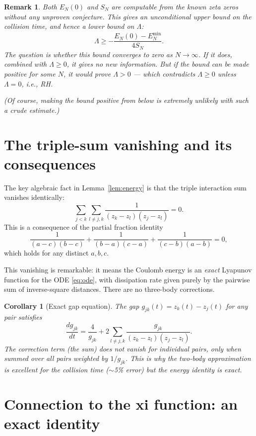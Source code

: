 \documentclass[11pt,a4paper]{article}
\newtheorem{corollary}{Corollary}
\newtheorem{remark}{Remark}
\begin{document}
\begin{remark}
  Both $E_N(0)$ and $S_N$ are computable from the known zeta
  zeros without any unproven conjecture. This gives an
  \emph{unconditional} upper bound on the collision time, and
  hence a lower bound on $\Lambda$:
  \[
    \Lambda \geq -\frac{E_N(0) - E_N^{\min}}{4S_N}.
  \]
  The question is whether this bound converges to zero as
  $N \to \infty$. If it does, combined with $\Lambda \geq 0$,
  it gives no new information. But if the bound can be made
  \emph{positive} for some $N$, it would prove $\Lambda > 0$
  --- which contradicts $\Lambda \geq 0$ unless $\Lambda = 0$,
  i.e., RH.

  (Of course, making the bound positive from below is
  extremely unlikely with such a crude estimate.)
\end{remark}

\section{The triple-sum vanishing and its consequences}

The key algebraic fact in Lemma~\ref{lem:energy} is that the
triple interaction sum vanishes identically:
\[
  \sum_{j<k}\sum_{l \neq j,k}
  \frac{1}{(z_k - z_l)(z_j - z_l)} = 0.
\]
This is a consequence of the partial fraction identity
\[
  \frac{1}{(a-c)(b-c)} + \frac{1}{(b-a)(c-a)}
  + \frac{1}{(c-b)(a-b)} = 0,
\]
which holds for any distinct $a, b, c$.

This vanishing is remarkable: it means the Coulomb energy is
an \emph{exact} Lyapunov function for the ODE \eqref{eq:ode},
with dissipation rate given purely by the pairwise sum of
inverse-square distances. There are no three-body corrections.

\begin{corollary}[Exact gap equation]
  The gap $g_{jk}(t) = z_k(t) - z_j(t)$ for any pair satisfies
  \begin{equation}\label{eq:gap-exact}
    \frac{dg_{jk}}{dt} = \frac{4}{g_{jk}}
    + 2\sum_{l \neq j,k}\frac{g_{jk}}{(z_k - z_l)(z_j - z_l)}.
  \end{equation}
  The correction term (the sum) does \emph{not} vanish for
  individual pairs, only when summed over all pairs weighted
  by $1/g_{jk}$. This is why the two-body approximation is
  excellent for the collision time ($\sim$5\% error) but the
  energy identity is exact.
\end{corollary}

\section{Connection to the xi function: an exact identity}
\end{document}
